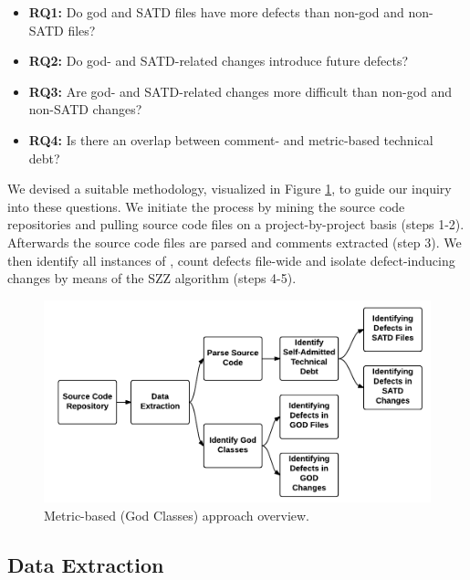 \begin{itemize}
	\vspace{0.1cm}
	\item {\bf RQ1:} Do god and SATD files have more defects than non-god and non-SATD files?
	\item {\bf RQ2:} Do god- and SATD-related changes introduce future defects?
	\item {\bf RQ3:} Are god- and SATD-related changes more difficult than non-god and non-SATD changes?
	\item {\bf RQ4:} Is there an overlap between comment- and metric-based technical debt? 
\end{itemize}

We devised a suitable methodology, visualized in Figure \ref{fig:CH4_Process_overview}, to guide our inquiry into these questions. We initiate the process by mining the source code repositories and pulling source code files on a project-by-project basis (steps 1-2). Afterwards the source code files are parsed and comments extracted (step 3). We then identify all instances of \SATD, count defects file-wide and isolate defect-inducing changes by means of the SZZ algorithm (steps 4-5).

\begin{figure}[h]
	\centering
	\includegraphics[width=150mm]{figures/chapter4/approach}
	\caption{Metric-based (God Classes) approach overview.}
	\label{fig:CH4_Process_overview}
\end{figure}


\subsection{Data Extraction}

